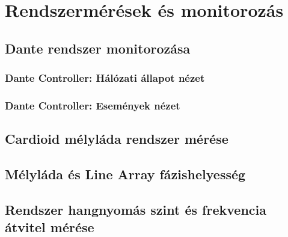 \section{Rendszermérések és monitorozás}



\subsection{Dante rendszer monitorozása}



\subsubsection{Dante Controller: Hálózati állapot nézet}



\subsubsection{Dante Controller: Események nézet}



\subsection{Cardioid mélyláda rendszer mérése}



\subsection{Mélyláda és Line Array fázishelyesség}



\subsection{Rendszer hangnyomás szint és frekvencia átvitel mérése}







